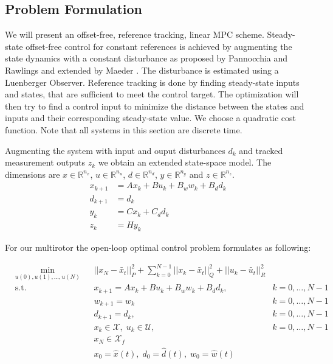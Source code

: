 \subsection{Problem Formulation}
We will present an offset-free, reference tracking, linear MPC scheme. Steady-state offset-free control for constant references is achieved by augmenting the state dynamics with a constant disturbance as proposed by Pannocchia and Rawlings and extended by Maeder \cite{Pannocchia2003a,Maeder2009}. The disturbance is estimated using a Luenberger Observer. Reference tracking is done by finding steady-state inputs and states, that are sufficient to meet the control target. The optimization will then try to find a control input to minimize the distance between the states and inputs and their corresponding steady-state value. We choose a quadratic cost function. Note that all systems in this section are discrete time. 

Augmenting the system with input and ouput disturbances $d_k$ and tracked measurement outputs $z_k$ we obtain an extended state-space model. The dimensions are $x\in\mathbb{R}^{n_x}$, $u\in\mathbb{R}^{n_u}$, $d\in\mathbb{R}^{n_d}$, $y\in\mathbb{R}^{n_y}$ and $z\in\mathbb{R}^{n_z}$.
\begin{align}
x_{k+1} &= A x_k + B u_k + B_w w_k + B_d d_k \label{eq:MPC_dt}\\
d_{k+1} &= d_k \nonumber \\ 
y_{k} &= C x_k + C_d d_k \nonumber \\
z_k &= H y_k 
\end{align}

For our multirotor the open-loop optimal control problem formulates as following:

\begin{align}
&\min_{u(0),u(1),\ldots,u(N)}
& & ||x_N-\bar{x}_t||_P^2 + \sum_{k=0}^{N-1} ||x_k - \bar{x}_t||_Q^2 + ||u_k - \bar{u}_t||_R^2  \label{eq:mpc_opti}\\
& \text{s.t.} 
& & x_{k+1} = A x_k + B u_k + B_w w_k + B_d d_k, & k = 0, \ldots, N-1 \nonumber\\
& & & w_{k+1} = w_k  & k = 0, \ldots, N-1 \nonumber\\
& & & d_{k+1} = d_k, & k = 0, \ldots, N-1 \nonumber\\
& & & x_k \in \mathcal{X}, \; u_k \in \mathcal{U}, & k = 0, \ldots, N-1 \nonumber\\
& & & x_N \in \mathcal{X}_f \nonumber\\
& & & x_0 = \hat x (t), \; d_0 = \hat d(t), \; w_0 = \hat w(t) \nonumber
\end{align}

